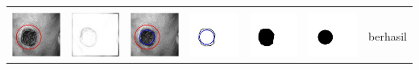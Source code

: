 \begin{table}[H]
\begin{tabular}{|m{0.7in}|m{0.7in}|m{0.7in}|m{0.7in}|m{0.7in}|m{0.7in}|m{0.7in}|}
		&  &  & & & &  \\
		\includegraphics[width=0.7in]{dataset/dataset_3/luka_hitam/ready/28_integer_init.jpg}&
		\includegraphics[width=0.7in]{dataset/dataset_3/luka_hitam/ready/28_integer_ext.jpg}&
		\includegraphics[width=0.7in]{dataset/dataset_3/luka_hitam/ready/28_integer_result.jpg}&
		\includegraphics[width=0.7in]{dataset/dataset_3/luka_hitam/ready/28_gt_r_integer.jpg}&
		\includegraphics[width=0.7in]{dataset/dataset_3/luka_hitam/ready/28_r.jpg}&
		\includegraphics[width=0.7in]{dataset/dataset_3/luka_hitam/ready/28_integer_r.jpg}&
		berhasil\\
		\hline
		

\end{tabular}
\end{table}
